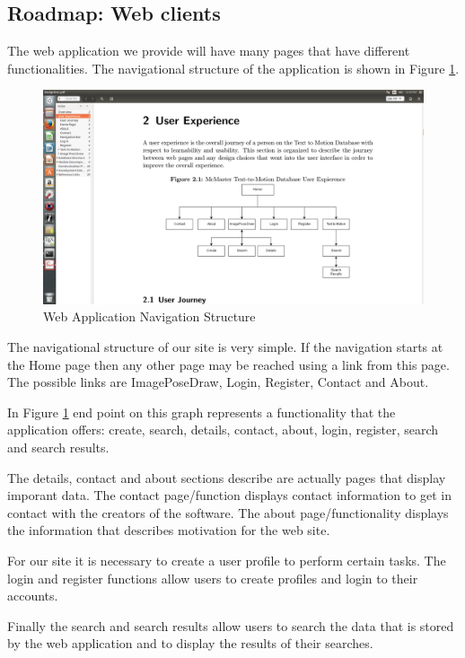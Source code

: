 \documentclass{scrreprt}
\begin{document}
\subsection{Roadmap: Web clients}

The web application we provide will have many pages that have different functionalities.  The navigational structure of the application is shown in Figure \ref{fig:navStruct}.

\begin{figure}
  \includegraphics[width=\linewidth]{apppicture.png}
  \caption{Web Application Navigation Structure}
  \label{fig:navStruct}
\end{figure}

The navigational structure of our site is very simple.  If the navigation starts at the Home page then any other page may be reached using a link from this page.  The possible links are ImagePoseDraw, Login, Register, Contact and About.

In Figure \ref{fig:navStruct} end point on this graph represents a functionality that the application offers: create, search, details, contact, about, login, register, search and search results.

The details, contact and about sections describe are actually pages that display imporant data.  The contact page/function displays contact information to get in contact with the creators of the software.  The about page/functionality displays the information that describes motivation for the web site.

For our site it is necessary to create a user profile to perform certain tasks.  The login and register functions allow users to create profiles and login to their accounts.

Finally the search and search results allow users to search the data that is stored by the web application and to display the results of their searches.
\end{document}
